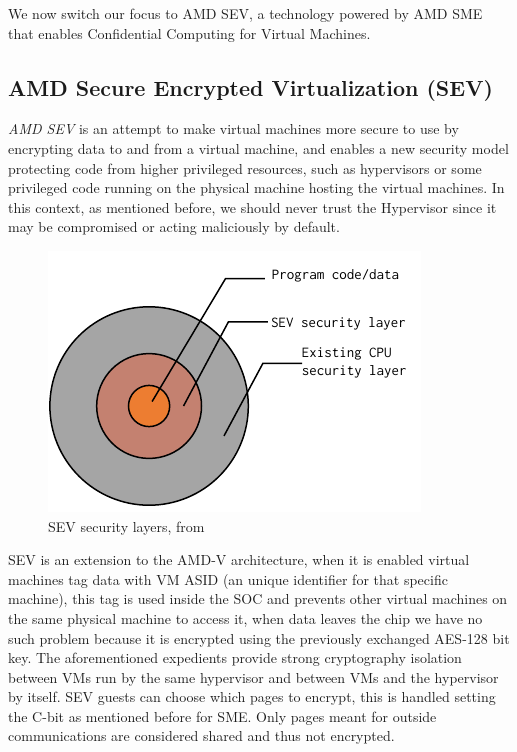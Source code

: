 \documentclass[twocolumn]{article}
\begin{document}
We now switch our focus to AMD SEV, a technology powered by AMD SME that enables Confidential Computing for Virtual Machines.

\subsection{AMD Secure Encrypted Virtualization (SEV)}

\textit{AMD SEV} is an attempt to make virtual machines more secure to use by encrypting data to and from a virtual machine, and enables a new security model protecting code from higher privileged resources, such as hypervisors or some privileged code running on the physical machine hosting the virtual machines. In this context, as mentioned before, we should never trust the Hypervisor since it may be compromised or acting maliciously by default.

\begin{figure}
    \centering
    \includegraphics[scale=0.9]{img/security-layers.pdf}
    \caption{SEV security layers, from \cite{memory-encryption}}
\end{figure}

SEV is an extension to the AMD-V architecture, when it is enabled virtual machines tag data with VM ASID (an unique identifier for that specific machine), this tag is used inside the SOC and prevents other virtual machines on the same physical machine to access it, when data leaves the chip we have no such problem because it is encrypted using the previously exchanged AES-128 bit key. The aforementioned expedients provide strong cryptography isolation between VMs run by the same hypervisor and between VMs and the hypervisor by itself. SEV guests can choose which pages to encrypt, this is handled setting the C-bit as mentioned before for SME. Only pages meant for outside communications are considered shared and thus not encrypted.
\end{document}
